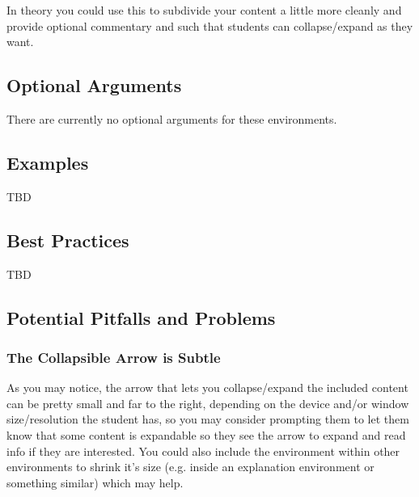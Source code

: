 \documentclass{ximera}
\begin{document}
        In theory you could use this to subdivide your content a little more cleanly and provide optional commentary and such that students can collapse/expand as they want. 
        
    \subsection*{Optional Arguments}
        There are currently no optional arguments for these environments.

    \subsection*{Examples}
    
        TBD
        
    \subsection*{Best Practices}
    
        TBD
        
    
    \subsection*{Potential Pitfalls and Problems}
    
        \subsubsection*{The Collapsible Arrow is Subtle}
            As you may notice, the arrow that lets you collapse/expand the included content can be pretty small and far to the right, depending on the device and/or window size/resolution the student has, so you may consider prompting them to let them know that some content is expandable so they see the arrow to expand and read info if they are interested. You could also include the environment within other environments to shrink it's size (e.g. inside an explanation environment or something similar) which may help.
    
\end{document}
